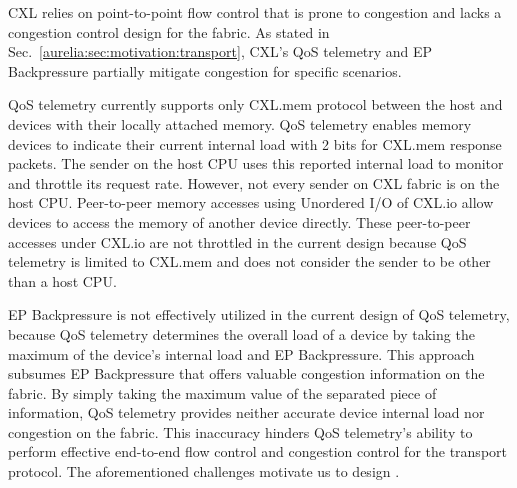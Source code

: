 CXL relies on point-to-point flow control that is prone to congestion and lacks a congestion control design for the fabric.
%
As stated in Sec.~\ref{aurelia:sec:motivation:transport}, CXL's QoS telemetry and EP Backpressure partially mitigate congestion for specific scenarios.

QoS telemetry currently supports only CXL.mem protocol between the host and devices with their locally attached memory.
%
QoS telemetry enables memory devices to indicate their current internal load with 2 bits for CXL.mem response packets.
%
The sender on the host CPU uses this reported internal load to monitor and throttle its request rate. 
%
However, not every sender on CXL fabric is on the host CPU. 
%
Peer-to-peer memory accesses using Unordered I/O of CXL.io allow devices to access the memory of another device directly. 
%
These peer-to-peer accesses under CXL.io are not throttled in the current design because QoS telemetry is limited to CXL.mem and does not consider the sender to be other than a host CPU.
%

EP Backpressure is not effectively utilized in the current design of QoS telemetry, because QoS telemetry determines the overall load of a device by taking the maximum of the device's internal load and EP Backpressure. 
%
This approach subsumes EP Backpressure that offers valuable congestion information on the fabric.
%
By simply taking the maximum value of the separated piece of information, QoS telemetry provides neither accurate device internal load nor congestion on the fabric.
%
This inaccuracy hinders QoS telemetry's ability to perform effective end-to-end flow control and congestion control for the transport protocol. 
%
The aforementioned challenges motivate us to design \aurelia.



